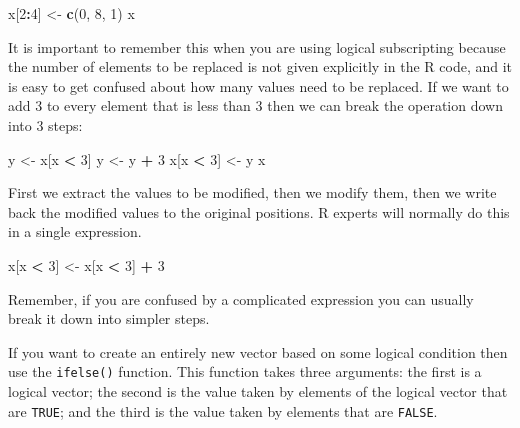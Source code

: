 \documentclass[
]{book}
\newenvironment{Shaded}{\begin{snugshade}}{\end{snugshade}}
\newcommand{\DecValTok}[1]{\textcolor[rgb]{0.00,0.00,0.81}{#1}}
\newcommand{\FunctionTok}[1]{\textcolor[rgb]{0.13,0.29,0.53}{\textbf{#1}}}
\newcommand{\NormalTok}[1]{#1}
\newcommand{\OtherTok}[1]{\textcolor[rgb]{0.56,0.35,0.01}{#1}}
\newcommand{\SpecialCharTok}[1]{\textcolor[rgb]{0.81,0.36,0.00}{\textbf{#1}}}
\begin{document}
\begin{Shaded}
\begin{Highlighting}[]
\NormalTok{x[}\DecValTok{2}\SpecialCharTok{:}\DecValTok{4}\NormalTok{] }\OtherTok{\textless{}{-}} \FunctionTok{c}\NormalTok{(}\DecValTok{0}\NormalTok{, }\DecValTok{8}\NormalTok{, }\DecValTok{1}\NormalTok{)}
\NormalTok{x}
\end{Highlighting}
\end{Shaded}

It is important to remember this when you are using logical
subscripting because the number of elements to be replaced is not
given explicitly in the R code, and it is easy to get confused about
how many values need to be replaced. If we want to add 3 to every
element that is less than 3 then we can break the operation down into
3 steps:

\begin{Shaded}
\begin{Highlighting}[]
\NormalTok{y }\OtherTok{\textless{}{-}}\NormalTok{ x[x }\SpecialCharTok{\textless{}} \DecValTok{3}\NormalTok{]}
\NormalTok{y }\OtherTok{\textless{}{-}}\NormalTok{ y }\SpecialCharTok{+} \DecValTok{3}
\NormalTok{x[x }\SpecialCharTok{\textless{}} \DecValTok{3}\NormalTok{] }\OtherTok{\textless{}{-}}\NormalTok{ y}
\NormalTok{x}
\end{Highlighting}
\end{Shaded}

First we extract the values to be modified, then we modify them, then we
write back the modified values to the original positions. R experts will
normally do this in a single expression.

\begin{Shaded}
\begin{Highlighting}[]
\NormalTok{x[x }\SpecialCharTok{\textless{}} \DecValTok{3}\NormalTok{] }\OtherTok{\textless{}{-}}\NormalTok{ x[x }\SpecialCharTok{\textless{}} \DecValTok{3}\NormalTok{] }\SpecialCharTok{+} \DecValTok{3}
\end{Highlighting}
\end{Shaded}

Remember, if you are confused by a complicated expression you can usually
break it down into simpler steps.

If you want to create an entirely new vector based on some logical
condition then use the \texttt{ifelse()} function. This function takes
three arguments: the first is a logical vector; the second is the
value taken by elements of the logical vector that are \texttt{TRUE}; and
the third is the value taken by elements that are \texttt{FALSE}.
\end{document}
